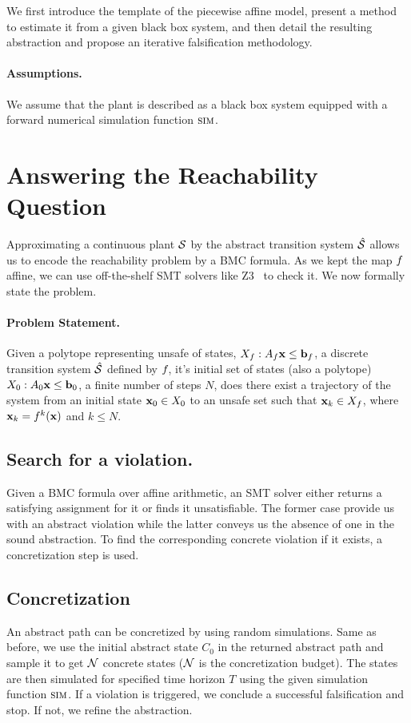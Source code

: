 We first introduce the template of the piecewise affine model, present
a method to estimate it from a given black box system, and then detail
the resulting abstraction and propose an iterative falsification
methodology.

\paragraph {Assumptions.} We assume that the plant is described as a
black box system equipped with a forward numerical simulation function
$\mbox{\sc sim}$.

\section{Answering the Reachability Question}

Approximating a continuous plant $\mathcal{S}$ by the abstract transition
system $\hat{\mathcal{S}}$ allows us to encode the reachability problem by a
BMC formula. As we kept the map $f_{}$ affine, we can use
off-the-shelf SMT solvers like Z3~\cite{DeMoura+Bjorner/08/Z3} to
check it. We now formally state the problem.

\paragraph{Problem Statement.} Given a polytope representing unsafe of
states, $X_f: A_f\mathbf{x} \le \mathbf{b}_f$, a discrete transition system
$\hat{\mathcal{S}}$ defined by $f_{}$, it's initial set of states (also a
polytope) $X_0: A_0\mathbf{x} \le \mathbf{b}_0$, a finite number of steps $N$, does
there exist a trajectory of the system from an initial state $\mathbf{x}_0
\in X_0$ to an unsafe set such that $\mathbf{x}_k \in X_f$, where $\mathbf{x}_k =
f_{}^k(\mathbf{x})$ and $k \le N$.

\subsection{Search for a violation.} Given a BMC formula over affine
arithmetic, an SMT solver either returns a satisfying assignment for
it or finds it unsatisfiable. The former case provide us with an
abstract violation while the latter conveys us the absence of one in
the sound abstraction. To find the corresponding concrete violation if
it exists, a concretization step is used.

\subsection{Concretization} An abstract path can be concretized by
using random simulations. Same as before, we use the initial abstract
state $C_0$ in the returned abstract path and sample it to get
$\mathcal{N}$ concrete states ($\mathcal{N}$ is the concretization budget).
The states are then simulated for specified time horizon $T$ using the
given simulation function $\mbox{\sc sim}$. If a violation is triggered, we
conclude a successful falsification and stop. If not, we refine the
abstraction.

